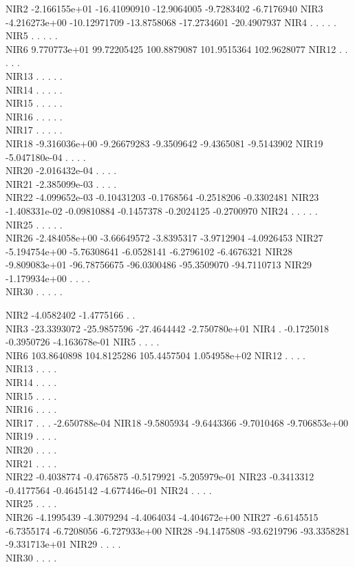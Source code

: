 \documentclass[
]{article}
\begin{document}
NIR2 -2.166155e+01 -16.41090910 -12.9064005 -9.7283402 -6.7176940 NIR3
-4.216273e+00 -10.12971709 -13.8758068 -17.2734601 -20.4907937 NIR4 . .
. . .\\
NIR5 . . . . .\\
NIR6 9.770773e+01 99.72205425 100.8879087 101.9515364 102.9628077 NIR12
. . . . .\\
NIR13 . . . . .\\
NIR14 . . . . .\\
NIR15 . . . . .\\
NIR16 . . . . .\\
NIR17 . . . . .\\
NIR18 -9.316036e+00 -9.26679283 -9.3509642 -9.4365081 -9.5143902 NIR19
-5.047180e-04 . . . .\\
NIR20 -2.016432e-04 . . . .\\
NIR21 -2.385099e-03 . . . .\\
NIR22 -4.099652e-03 -0.10431203 -0.1768564 -0.2518206 -0.3302481 NIR23
-1.408331e-02 -0.09810884 -0.1457378 -0.2024125 -0.2700970 NIR24 . . . .
.\\
NIR25 . . . . .\\
NIR26 -2.484058e+00 -3.66649572 -3.8395317 -3.9712904 -4.0926453 NIR27
-5.194754e+00 -5.76308641 -6.0528141 -6.2796102 -6.4676321 NIR28
-9.809083e+01 -96.78756675 -96.0300486 -95.3509070 -94.7110713 NIR29
-1.179934e+00 . . . .\\
NIR30 . . . . .

NIR2 -4.0582402 -1.4775166 . .\\
NIR3 -23.3393072 -25.9857596 -27.4644442 -2.750780e+01 NIR4 . -0.1725018
-0.3950726 -4.163678e-01 NIR5 . . . .\\
NIR6 103.8640898 104.8125286 105.4457504 1.054958e+02 NIR12 . . . .\\
NIR13 . . . .\\
NIR14 . . . .\\
NIR15 . . . .\\
NIR16 . . . .\\
NIR17 . . . -2.650788e-04 NIR18 -9.5805934 -9.6443366 -9.7010468
-9.706853e+00 NIR19 . . . .\\
NIR20 . . . .\\
NIR21 . . . .\\
NIR22 -0.4038774 -0.4765875 -0.5179921 -5.205979e-01 NIR23 -0.3413312
-0.4177564 -0.4645142 -4.677446e-01 NIR24 . . . .\\
NIR25 . . . .\\
NIR26 -4.1995439 -4.3079294 -4.4064034 -4.404672e+00 NIR27 -6.6145515
-6.7355174 -6.7208056 -6.727933e+00 NIR28 -94.1475808 -93.6219796
-93.3358281 -9.331713e+01 NIR29 . . . .\\
NIR30 . . . .
\end{document}
